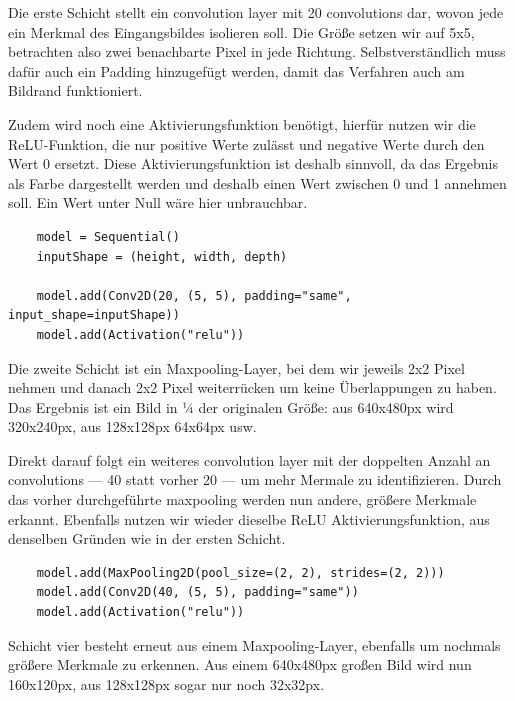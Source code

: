 \documentclass[conference]{IEEEtran}
\begin{document}
	Die erste Schicht stellt ein convolution layer mit 20 convolutions dar, wovon jede ein Merkmal des Eingangsbildes isolieren soll.
	Die Größe setzen wir auf 5x5, betrachten also zwei benachbarte Pixel in jede Richtung.
	Selbstverständlich muss dafür auch ein Padding hinzugefügt werden, damit das Verfahren auch am Bildrand funktioniert. 
	
	Zudem wird noch eine Aktivierungsfunktion benötigt, hierfür nutzen wir die ReLU-Funktion, die nur positive Werte zulässt und negative Werte durch den Wert 0 ersetzt.
	Diese Aktivierungsfunktion ist deshalb sinnvoll, da das Ergebnis als Farbe dargestellt werden und deshalb einen Wert zwischen 0 und 1 annehmen soll.
	Ein Wert unter Null wäre hier unbrauchbar.
	
	\begin{verbatim}
	model = Sequential()
	inputShape = (height, width, depth)
	
	model.add(Conv2D(20, (5, 5), padding="same", input_shape=inputShape))
	model.add(Activation("relu"))
	\end{verbatim}
	
	Die zweite Schicht ist ein Maxpooling-Layer, bei dem wir jeweils 2x2 Pixel nehmen und danach 2x2 Pixel weiterrücken um keine Überlappungen zu haben.
	Das Ergebnis ist ein Bild in ¼ der originalen Größe: aus 640x480px wird 320x240px, aus 128x128px 64x64px usw.
	
	Direkt darauf folgt ein weiteres convolution layer mit der doppelten Anzahl an convolutions — 40 statt vorher 20 — um mehr Mermale zu identifizieren.
	Durch das vorher durchgeführte maxpooling werden nun andere, größere Merkmale erkannt.
	Ebenfalls nutzen wir wieder dieselbe ReLU Aktivierungsfunktion, aus denselben Gründen wie in der ersten Schicht.
	
	\begin{verbatim}
	model.add(MaxPooling2D(pool_size=(2, 2), strides=(2, 2)))
	model.add(Conv2D(40, (5, 5), padding="same"))
	model.add(Activation("relu"))
	\end{verbatim}
	
	
	
	Schicht vier besteht erneut aus einem Maxpooling-Layer, ebenfalls um nochmals größere Merkmale zu erkennen.
	Aus einem 640x480px großen Bild wird nun 160x120px, aus 128x128px sogar nur noch 32x32px.
	
\end{document}
